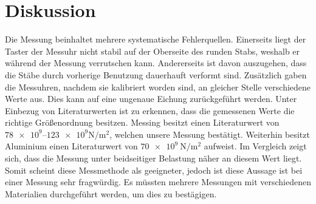 \section{Diskussion}
Die Messung beinhaltet mehrere systematische Fehlerquellen.
Einerseits liegt der Taster der Messuhr nicht stabil auf der Oberseite des runden Stabs, weshalb er während der Messung verrutschen kann.
Andererseits ist davon auszugehen, dass die Stäbe durch vorherige Benutzung dauerhauft verformt sind.
Zusätzlich gaben die Messuhren, nachdem sie kalibriert worden sind, an gleicher Stelle 
verschiedene Werte aus.
Dies kann auf eine ungenaue Eichung zurückgeführt werden.
Unter Einbezug von Literaturwerten ist zu erkennen, dass die gemessenen Werte die richtige 
Größenordnung besitzen.
Messing besitzt einen Literaturwert von 
\mbox{$\num{78e9}$--$\num{123e9}\si{\newton\per\meter\squared}$\cite{lit_wert}}, welchen unsere 
Messung bestätigt.
Weiterhin besitzt Aluminium einen Literaturwert von 
$\SI{70e9}{\newton\per\meter\squared}$\cite{lit_wert} aufweist.
Im Vergleich zeigt sich, dass die Messung unter beidseitiger Belastung näher an diesem Wert liegt.
Somit scheint diese Messmethode als geeigneter, jedoch ist diese Aussage ist bei einer Messung 
sehr fragwürdig.
Es müssten mehrere Messungen mit verschiedenen Materialien durchgeführt werden, um dies zu bestägigen.
